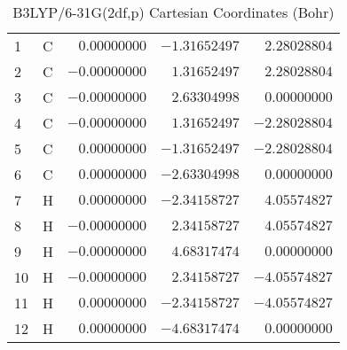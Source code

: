 \documentclass[10pt,oneside]{article}
\begin{document}
\begin{table}[h!]
\centering
\caption{B3LYP/6-31G(2df,p) Cartesian Coordinates (Bohr)}
\begin{tabular}{llrrr}
1  & C  & $ 0.00000000$ & $-1.31652497$ & $ 2.28028804$ \\
2  & C  & $-0.00000000$ & $ 1.31652497$ & $ 2.28028804$ \\
3  & C  & $-0.00000000$ & $ 2.63304998$ & $ 0.00000000$ \\
4  & C  & $-0.00000000$ & $ 1.31652497$ & $-2.28028804$ \\
5  & C  & $ 0.00000000$ & $-1.31652497$ & $-2.28028804$ \\
6  & C  & $ 0.00000000$ & $-2.63304998$ & $ 0.00000000$ \\
7  & H  & $ 0.00000000$ & $-2.34158727$ & $ 4.05574827$ \\
8  & H  & $-0.00000000$ & $ 2.34158727$ & $ 4.05574827$ \\
9  & H  & $-0.00000000$ & $ 4.68317474$ & $ 0.00000000$ \\
10 & H  & $-0.00000000$ & $ 2.34158727$ & $-4.05574827$ \\
11 & H  & $ 0.00000000$ & $-2.34158727$ & $-4.05574827$ \\
12 & H  & $ 0.00000000$ & $-4.68317474$ & $ 0.00000000$ \\
\end{tabular}
\end{table}

\clearpage
\end{document}
